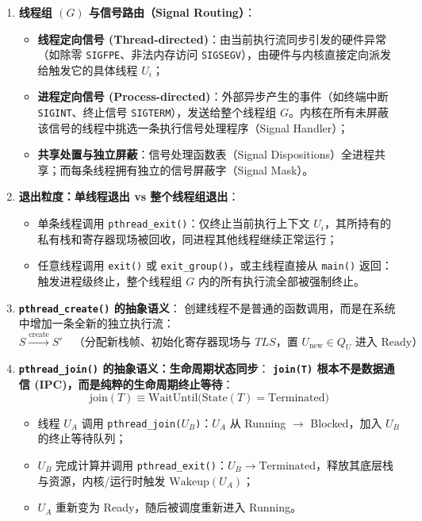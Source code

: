 \documentclass[11pt,a4paper]{ctexart}
\newcommand{\kw}[1]{\textbf{#1}}
\newcommand{\code}[1]{\texttt{#1}}
\begin{document}
\begin{enumerate}
\item \kw{线程组 $(G)$ 与信号路由（Signal Routing）}：
  \begin{itemize}
    \item \kw{线程定向信号 (Thread-directed)}：由当前执行流同步引发的硬件异常（如除零 \code{SIGFPE}、非法内存访问 \code{SIGSEGV}），由硬件与内核直接定向派发给触发它的具体线程 $U_i$；
    \item \kw{进程定向信号 (Process-directed)}：外部异步产生的事件（如终端中断 \code{SIGINT}、终止信号 \code{SIGTERM}），发送给整个线程组 $G$。内核在所有未屏蔽该信号的线程中挑选一条执行信号处理程序（Signal Handler）；
    \item \kw{共享处置与独立屏蔽}：信号处理函数表（Signal Dispositions）全进程共享；而每条线程拥有独立的信号屏蔽字（Signal Mask）。
  \end{itemize}

\item \kw{退出粒度：单线程退出 vs 整个线程组退出}：
  \begin{itemize}
    \item 单条线程调用 \code{pthread\_exit()}：仅终止当前执行上下文 $U_i$，其所持有的私有栈和寄存器现场被回收，同进程其他线程继续正常运行；
    \item 任意线程调用 \code{exit()} 或 \code{exit\_group()}，或主线程直接从 \code{main()} 返回：触发进程级终止，整个线程组 $G$ 内的所有执行流全部被强制终止。
  \end{itemize}

\item \kw{\code{pthread\_create()} 的抽象语义}：
  创建线程不是普通的函数调用，而是在系统中增加一条全新的独立执行流：
  \[
  S \xrightarrow{\text{create}} S' \quad \text{（分配新栈帧、初始化寄存器现场与 } TLS\text{，置 } U_{\text{new}} \in Q_U\text{ 进入 Ready）}
  \]

\item \kw{\code{pthread\_join()} 的抽象语义：生命周期状态同步}：
  \kw{\code{join(T)} 根本不是数据通信 (IPC)，而是纯粹的生命周期终止等待}：
  \[
  \boxed{\text{join}(T) \equiv \text{WaitUntil}\big(\text{State}(T) = \text{Terminated}\big)}
  \]
  \begin{itemize}
    \item 线程 $U_A$ 调用 \code{pthread\_join($U_B$)}：$U_A$ 从 Running $\to$ Blocked，加入 $U_B$ 的终止等待队列；
    \item $U_B$ 完成计算并调用 \code{pthread\_exit()}：$U_B \to \text{Terminated}$，释放其底层栈与资源，内核/运行时触发 $\text{Wakeup}(U_A)$；
    \item $U_A$ 重新变为 Ready，随后被调度重新进入 Running。
  \end{itemize}
\end{enumerate}
\end{document}
